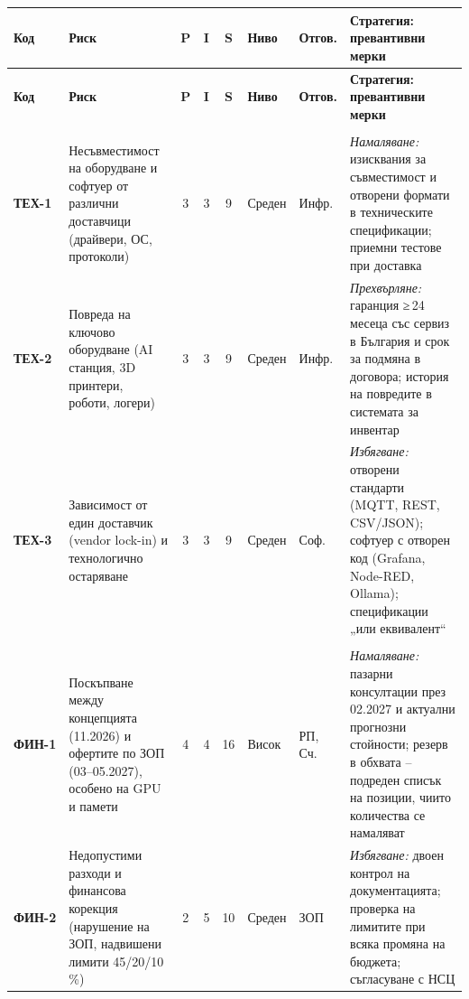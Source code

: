 \documentclass[11pt,a4paper]{article}
\renewcommand{\arraystretch}{1.15}
\begin{document}
\begingroup\footnotesize
\setlength{\tabcolsep}{3pt}
\renewcommand{\arraystretch}{1.05}
\setlength{\LTpre}{3pt}\setlength{\LTpost}{0pt}
\begin{xltabular}{\textwidth}{@{}>{\bfseries}l>{\raggedright\arraybackslash{}\hsize}X ccc >{\centering\arraybackslash}p{1.12cm}>{\raggedright\arraybackslash}p{1.05cm}>{\raggedright\arraybackslash{}\hsize}X@{}}
\toprule
{}Код & \textbf{Риск} & \textbf{P} & \textbf{I} & \textbf{S} & \textbf{Ниво} & \textbf{Отгов.} & \textbf{Стратегия: превантивни мерки}\\
\midrule
\endfirsthead
\toprule
{}Код & \textbf{Риск} & \textbf{P} & \textbf{I} & \textbf{S} & \textbf{Ниво} & \textbf{Отгов.} & \textbf{Стратегия: превантивни мерки}\\
\midrule
\endhead
\bottomrule
\endlastfoot
{}\\*
ТЕХ-1 & Несъвместимост на оборудване и софтуер от различни доставчици (драйвери, ОС, протоколи) & 3 & 3 & 9 & Среден & Инфр. & \textit{Намаляване:} изисквания за съвместимост и отворени формати в техническите спецификации; приемни тестове при доставка\\
ТЕХ-2 & Повреда на ключово оборудване (AI станция, 3D принтери, роботи, логери) & 3 & 3 & 9 & Среден & Инфр. & \textit{Прехвърляне:} гаранция ≥\,24 месеца със сервиз в България и срок за подмяна в договора; история на повредите в системата за инвентар\\
ТЕХ-3 & Зависимост от един доставчик (vendor lock-in) и технологично остаряване & 3 & 3 & 9 & Среден & Соф. & \textit{Избягване:} отворени стандарти (MQTT, REST, CSV/JSON); софтуер с отворен код (Grafana, Node-RED, Ollama); спецификации „или еквивалент“\\
\\*
ФИН-1 & Поскъпване между концепцията (11.2026) и офертите по ЗОП (03–05.2027), особено на GPU и памети & 4 & 4 & 16 & Висок & РП, Сч. & \textit{Намаляване:} пазарни консултации през 02.2027 и актуални прогнозни стойности; резерв в обхвата – подреден списък на позиции, чиито количества се намаляват\\
ФИН-2 & Недопустими разходи и финансова корекция (нарушение на ЗОП, надвишени лимити 45/20/10\,\%) & 2 & 5 & 10 & Среден & ЗОП & \textit{Избягване:} двоен контрол на документацията; проверка на лимитите при всяка промяна на бюджета; съгласуване с НСЦ\\

\end{xltabular}
\end{document}
